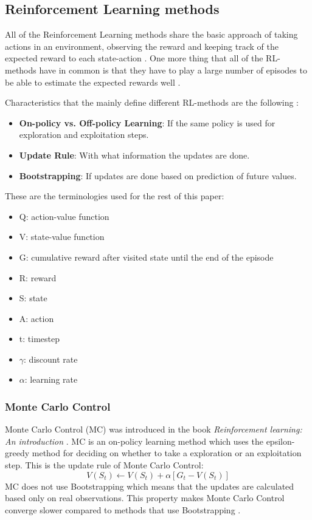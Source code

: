 \documentclass[conference]{IEEEtran}
\begin{document}
\subsection{Reinforcement Learning methods}
All of the Reinforcement Learning methods share the basic approach of taking actions in an environment, observing the reward and keeping track of the expected reward to each state-action \cite{b4}.
One more thing that all of the RL-methods have in common is that they have to play a large number of episodes to be able to estimate the expected rewards well \cite{b4}.

Characteristics that the mainly define different RL-methods are the following \cite{b4}:
\begin{itemize}
	\item \textbf{On-policy vs. Off-policy Learning}: If the same policy is used for exploration and exploitation steps. 
	\item \textbf{Update Rule}: With what information the updates are done. 
	\item \textbf{Bootstrapping}: If updates are done based on prediction of future values. 
\end{itemize}

These are the terminologies used for the rest of this paper: 
\begin{itemize}
	\item Q: action-value function
	\item V: state-value function
	\item G: cumulative reward after visited state until the end of the episode 
	\item R: reward
	\item S: state
	\item A: action
	\item t: timestep
	\item $\gamma$: discount rate
	\item $\alpha$: learning rate
\end{itemize}

\subsubsection{Monte Carlo Control}
Monte Carlo Control (MC) was introduced in the book \textit{Reinforcement learning: An introduction} \cite{b4}.
MC is an on-policy learning method which uses the epsilon-greedy method for deciding on whether to take a exploration or an exploitation step.
This is the update rule of Monte Carlo Control:
\begin{equation*}
	V(S_t) \leftarrow V(S_t) + \alpha [G_t - V(S_t)] \tag{1}
\end{equation*}
MC does not use Bootstrapping which means that the updates are calculated based only on real observations. 
This property makes Monte Carlo Control converge slower compared to methods that use Bootstrapping \cite{b4}.  
\end{document}
